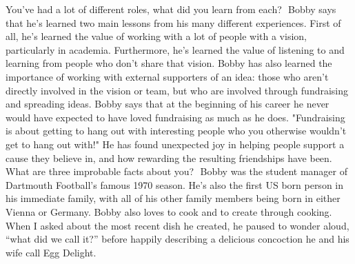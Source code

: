 \documentclass[12pt]{amsart}
\begin{document}
\begin{multicols}{2}
You've had a lot of different roles, what did you learn from each? 
Bobby says that he's learned two main lessons from his many 
different experiences. First of all, he's learned the value of working 
with a lot of people with a vision, particularly in academia. 
Furthermore, he's learned the value of listening to and learning 
from people who don't share that vision. Bobby has also learned 
the importance of working with external supporters of an idea: those 
who aren't directly involved in the vision or team, but who are 
involved through fundraising and spreading ideas. Bobby says that at 
the beginning of his career he never would have expected to have 
loved fundraising as much as he does. "Fundraising is about 
getting to hang out with interesting people who you otherwise 
wouldn't get to hang out with!" He has found unexpected joy in 
helping people support a cause they believe in, and how rewarding 
the resulting friendships have been. 
  
What are three improbable facts about you? 
Bobby was the student manager of Dartmouth Football’s famous
1970 season. He’s also the first US born person in his immediate
family, with all of his other family members being born in either
Vienna or Germany. Bobby also loves to cook and to create through
cooking. When I asked about the most recent dish he created, he
paused to wonder aloud, “what did we call it?” before happily
describing a delicious concoction he and his wife call Egg Delight.
\end{multicols}
\end{document}
